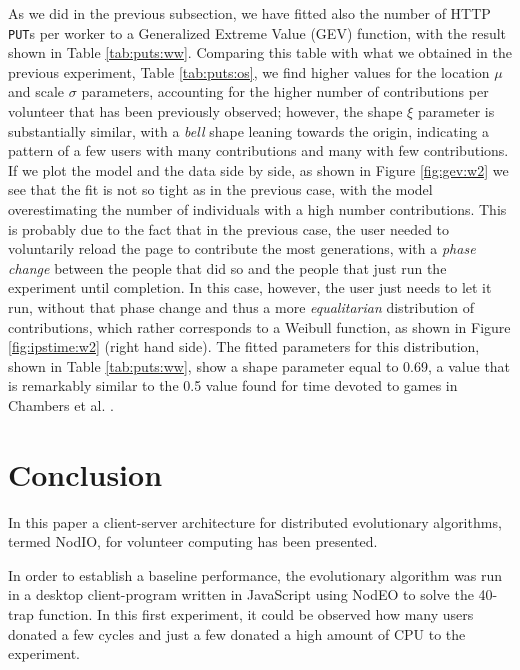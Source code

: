 \documentclass[journal,onecolumn]{IEEEtran}
\begin{document}
As we did in the previous subsection, we have fitted also the number
of HTTP {\tt PUT}s per worker to a  Generalized Extreme Value (GEV) function, with the result shown %
in Table \ref{tab:puts:ww}. Comparing this table with what we obtained
in the previous experiment, Table \ref{tab:puts:os}, we find higher values
for the location $\mu$ and scale $\sigma$ parameters, accounting for
the higher number of contributions per volunteer that has been
previously observed; however, the shape $\xi$ parameter is
substantially similar, with a {\em bell} shape leaning towards the
origin, indicating a pattern of a few users with many contributions
and many with few contributions. If we plot the model and the data
side by side, as shown in Figure \ref{fig:gev:w2} we see that the fit
is not so tight as in the previous case, with the model overestimating
the number of individuals with a high number contributions. This is
probably due to the fact that in the previous case, the user needed to
voluntarily reload the page to contribute the most generations, with a
{\em phase change} between the people that did so and the people that
just run the experiment until completion. In this case, however, the
user just needs to let it run, without that phase change and thus a
more {\em equalitarian} distribution of contributions, which rather
corresponds to a Weibull function, as shown in Figure
\ref{fig:ipstime:w2} (right hand side). The fitted parameters for this
distribution, shown in Table \ref{tab:puts:ww}, show a shape parameter
equal to 0.69, a value that is remarkably similar to the 0.5 value
found for time devoted to games in Chambers et
al. \cite{chambers2005measurement}.



\section{Conclusion}
\label{sec:conclusion}


In this paper a client-server architecture for distributed evolutionary algorithms, termed {\sf NodIO}, for volunteer computing has been presented. 


In order to establish a baseline performance, the evolutionary algorithm was run in a desktop client-program written in JavaScript using NodEO to solve the 40-trap function.
In this first experiment, it could be observed how many users donated a few cycles and just a few donated a high amount of CPU to the experiment.
\end{document}
